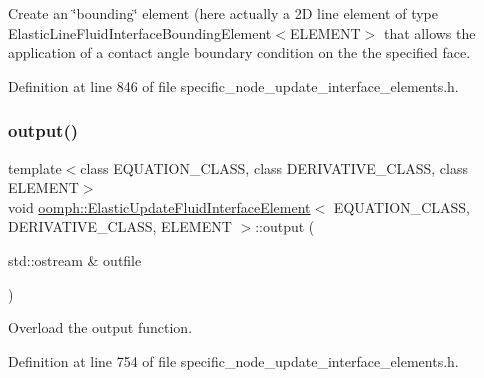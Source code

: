 Create an \char`\"{}bounding\char`\"{} element (here actually a 2D line element of type Elastic\+Line\+Fluid\+Interface\+Bounding\+Element$<$\+E\+L\+E\+M\+E\+N\+T$>$ that allows the application of a contact angle boundary condition on the the specified face. 



Definition at line 846 of file specific\+\_\+node\+\_\+update\+\_\+interface\+\_\+elements.\+h.

\mbox{\label{classoomph_1_1ElasticUpdateFluidInterfaceElement_a46b22d178b248355083a3564e4e92eb0}} 
\subsubsection{\texorpdfstring{output()}{output()}\hspace{0.1cm}{\footnotesize\ttfamily [1/4]}}
{\footnotesize\ttfamily template$<$class E\+Q\+U\+A\+T\+I\+O\+N\+\_\+\+C\+L\+A\+SS, class D\+E\+R\+I\+V\+A\+T\+I\+V\+E\+\_\+\+C\+L\+A\+SS, class E\+L\+E\+M\+E\+NT$>$ \\
void \hyperlink{classoomph_1_1ElasticUpdateFluidInterfaceElement}{oomph\+::\+Elastic\+Update\+Fluid\+Interface\+Element}$<$ E\+Q\+U\+A\+T\+I\+O\+N\+\_\+\+C\+L\+A\+SS, D\+E\+R\+I\+V\+A\+T\+I\+V\+E\+\_\+\+C\+L\+A\+SS, E\+L\+E\+M\+E\+NT $>$\+::output (\begin{DoxyParamCaption}\item[{std\+::ostream \&}]{outfile }\end{DoxyParamCaption})\hspace{0.3cm}{\ttfamily [inline]}}



Overload the output function. 



Definition at line 754 of file specific\+\_\+node\+\_\+update\+\_\+interface\+\_\+elements.\+h.

\mbox{\label{classoomph_1_1ElasticUpdateFluidInterfaceElement_ac193aa64a8223a96e4148a5af456fb64}} 
